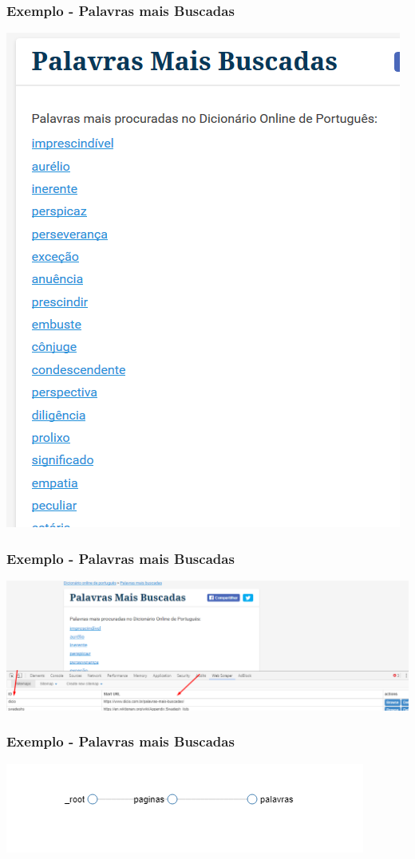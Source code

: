 \documentclass{beamer}
\begin{document}
\begin{frame}
\frametitle{Exemplo - Palavras mais Buscadas}
\includegraphics[width=\textwidth]{Dicio_com_br.png}
\end{frame}

\begin{frame}
\frametitle{Exemplo - Palavras mais Buscadas}
\includegraphics[width=\textwidth]{palavras_freq0.png}
\end{frame}


\begin{frame}
\frametitle{Exemplo - Palavras mais Buscadas}
\includegraphics[width=\textwidth]{palavras_freq.png}
\end{frame}
\end{document}
